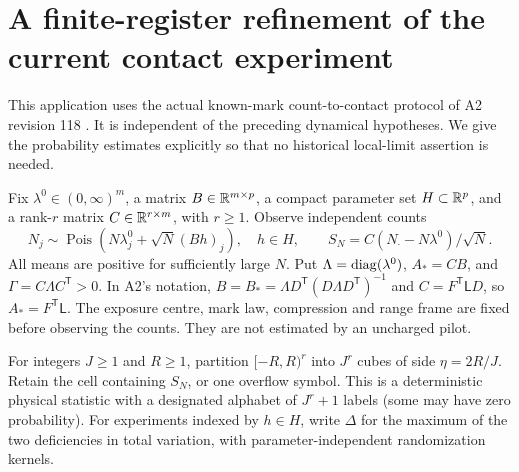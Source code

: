 \section{A finite-register refinement of the current contact experiment}
\label{sec:v6-a2}
This application uses the actual known-mark count-to-contact protocol
of A2 revision 118 \cite[Theorems on contact experiments and quantized
scores]{QiA2v118}. It is independent of the preceding dynamical
hypotheses. We give the probability estimates explicitly so that no
historical local-limit assertion is needed.

Fix $\lambda^0\in(0,\infty)^m$, a matrix $B\in\mathbb R^{m\times p}$,
a compact parameter set $H\subset\mathbb R^p$, and a rank-$r$ matrix
$C\in\mathbb R^{r\times m}$, with $r\ge1$. Observe independent counts
\[
 N_j\sim\operatorname{Pois}(N\lambda_j^0+\sqrt N(Bh)_j),
 \quad h\in H,
 \qquad S_N=C(N_\cdot-N\lambda^0)/\sqrt N.
\]
All means are positive for sufficiently large $N$.
Put $\Lambda=\operatorname{diag}(\lambda^0)$, $A_*=CB$, and
$\Gamma=C\Lambda C^{\mathsf T}>0$. In A2's notation,
$B=B_*=\Lambda D^{\mathsf T}(D\Lambda D^{\mathsf T})^{-1}$ and
$C=F^{\mathsf T}\mathsf L D$, so $A_*=F^{\mathsf T}\mathsf L$.
The exposure centre, mark law, compression and range frame are fixed
before observing the counts. They are not estimated by an uncharged
pilot.

For integers $J\ge1$ and $R\ge1$, partition $[-R,R)^r$ into $J^r$
cubes of side $\eta=2R/J$. Retain the cell containing $S_N$, or one
overflow symbol. This is a deterministic physical statistic with a designated alphabet
of $J^r+1$ labels (some may have zero probability). For experiments indexed by $h\in H$,
write $\Delta$ for the maximum of the two deficiencies in total
variation, with parameter-independent randomization kernels.


